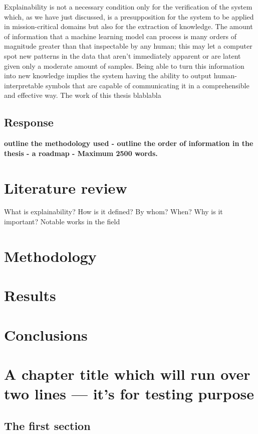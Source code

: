 \documentclass[mscthesis]{usiinfthesis}
\begin{document}
Explainability is not a necessary condition only for the verification of the system which, as we have just discussed, is a presupposition for the system to be applied in mission-critical domains but also for the extraction of knowledge.  The amount of information that a machine learning model can process is many orders of magnitude greater than that inspectable by any human; this may let a computer spot new patterns in the data that aren't immediately apparent or are latent given only a moderate amount of samples.  Being able to turn this information into new knowledge implies the system having the ability to output human-interpretable symbols that are capable of communicating it in a comprehensible and effective way.
The work of this thesis blablabla %
  
\section{Response}
\textbf{outline the methodology used - 
outline the order of information in the thesis - a roadmap - Maximum 2500 words.}

\chapter{Literature review}
What is explainability?
How is it defined?  By whom?  When?
Why is it important?
Notable works in the field

\chapter{Methodology}

\chapter{Results}

\chapter{Conclusions}


\chapter[Short title]{A chapter title which will run over two lines --- it's for
  testing purpose}

\lipsum[1-2]

\section{The first section}
\lipsum[3-4]
\end{document}
